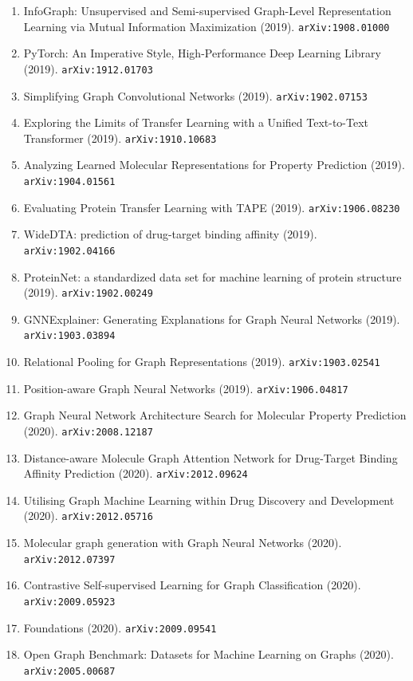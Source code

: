 \documentclass[11pt]{article}
\begin{document}
\begin{enumerate}
  \item InfoGraph: Unsupervised and Semi-supervised Graph-Level Representation
  Learning via Mutual Information Maximization (2019). \texttt{arXiv:1908.01000}
  \item PyTorch: An Imperative Style, High-Performance Deep Learning Library (2019). \texttt{arXiv:1912.01703}
  \item Simplifying Graph Convolutional Networks (2019). \texttt{arXiv:1902.07153}
  \item Exploring the Limits of Transfer Learning with a Unified Text-to-Text
  Transformer (2019). \texttt{arXiv:1910.10683}
  \item Analyzing Learned Molecular Representations for Property Prediction (2019). \texttt{arXiv:1904.01561}
  \item Evaluating Protein Transfer Learning with TAPE (2019). \texttt{arXiv:1906.08230}
  \item WideDTA: prediction of drug-target binding affinity (2019). \texttt{arXiv:1902.04166}
  \item ProteinNet: a standardized data set for machine learning of protein
  structure (2019). \texttt{arXiv:1902.00249}
  \item GNNExplainer: Generating Explanations for Graph Neural Networks (2019). \texttt{arXiv:1903.03894}
  \item Relational Pooling for Graph Representations (2019). \texttt{arXiv:1903.02541}
  \item Position-aware Graph Neural Networks (2019). \texttt{arXiv:1906.04817}
  \item Graph Neural Network Architecture Search for Molecular Property
  Prediction (2020). \texttt{arXiv:2008.12187}
  \item Distance-aware Molecule Graph Attention Network for Drug-Target Binding
  Affinity Prediction (2020). \texttt{arXiv:2012.09624}
  \item Utilising Graph Machine Learning within Drug Discovery and Development (2020). \texttt{arXiv:2012.05716}
  \item Molecular graph generation with Graph Neural Networks (2020). \texttt{arXiv:2012.07397}
  \item Contrastive Self-supervised Learning for Graph Classification (2020). \texttt{arXiv:2009.05923}
  \item Foundations (2020). \texttt{arXiv:2009.09541}
  \item Open Graph Benchmark: Datasets for Machine Learning on Graphs (2020). \texttt{arXiv:2005.00687}

\end{enumerate}
\end{document}

